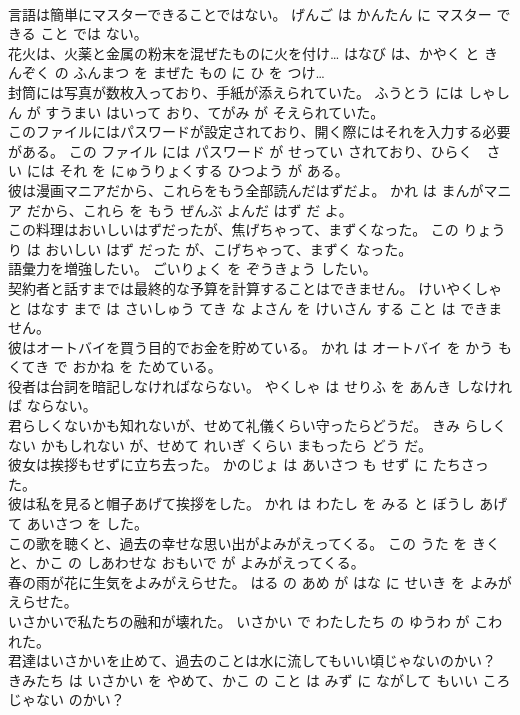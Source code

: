 \documentclass[8pt]{extreport}
\begin{document}
\begin{CJK}{UTF8}{min}
\\	言語は簡単にマスターできることではない。	げんご は かんたん に マスター できる こと では ない。	
\\	花火は、火薬と金属の粉末を混ぜたものに火を付け…	はなび は、かやく と きんぞく の ふんまつ を まぜた もの に ひ を つけ…	
\\	封筒には写真が数枚入っており、手紙が添えられていた。	ふうとう には しゃしん が すうまい はいって おり、てがみ が そえられていた。	
\\	このファイルにはパスワードが設定されており、開く際にはそれを入力する必要がある。	この ファイル には パスワード が せってい されており、ひらく　さい には それ を にゅうりょくする ひつよう が ある。	
\\	彼は漫画マニアだから、これらをもう全部読んだはずだよ。	かれ は まんがマニア だから、これら を もう ぜんぶ よんだ はず だ よ。	
\\	この料理はおいしいはずだったが、焦げちゃって、まずくなった。	この りょうり は おいしい はず だった が、こげちゃって、まずく なった。	
\\	語彙力を増強したい。	ごいりょく を ぞうきょう したい。	
\\	契約者と話すまでは最終的な予算を計算することはできません。	けいやくしゃ と はなす まで は さいしゅう てき な よさん を けいさん する こと は できません。	
\\	彼はオートバイを買う目的でお金を貯めている。	かれ は オートバイ を かう もくてき で おかね を ためている。	
\\	役者は台詞を暗記しなければならない。	やくしゃ は せりふ を あんき しなければ ならない。	
\\	君らしくないかも知れないが、せめて礼儀くらい守ったらどうだ。	きみ らしくない かもしれない が、せめて れいぎ くらい まもったら どう だ。	
\\	彼女は挨拶もせずに立ち去った。	かのじょ は あいさつ も せず に たちさった。	
\\	彼は私を見ると帽子あげて挨拶をした。	かれ は わたし を みる と ぼうし あげて あいさつ を した。	
\\	この歌を聴くと、過去の幸せな思い出がよみがえってくる。	この うた を きく と、かこ の しあわせな おもいで が よみがえってくる。	
\\	春の雨が花に生気をよみがえらせた。	はる の あめ が はな に せいき を よみがえらせた。	
\\	いさかいで私たちの融和が壊れた。	いさかい で わたしたち の ゆうわ が こわれた。	
\\	君達はいさかいを止めて、過去のことは水に流してもいい頃じゃないのかい？	きみたち は いさかい を やめて、かこ の こと は みず に ながして もいい ころ じゃない のかい？	

\end{CJK}
\end{document}
